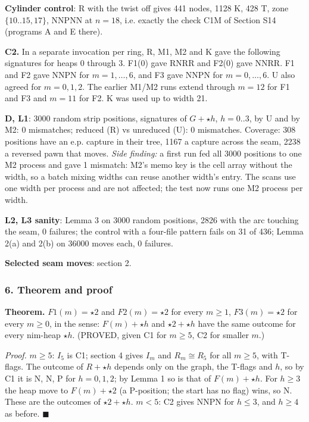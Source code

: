 \textbf{Cylinder control}: R with the twist off gives 441 nodes, 1128 K, 428 T, zone $\{10..15,17\}$, NNPNN at $n=18$, i.e. exactly the check C1M of Section S14 (programs A and E there).

\textbf{C2.} In a separate invocation per ring, R, M1, M2 and K gave the following signatures for heaps 0 through 3. F1(0) gave RNRR and F2(0) gave NNRR. F1 and F2 gave NNPN for $m=1,\ldots,6$, and F3 gave NNPN for $m=0,\ldots,6$. U also agreed for $m=0,1,2$. The earlier M1/M2 runs extend through $m=12$ for F1 and F3 and $m=11$ for F2. K was used up to width 21.

\textbf{D, L1}: 3000 random strip positions, signatures of $G+\star h$, $h=0..3$, by U and by M2: 0 mismatches; reduced (R) vs unreduced (U): 0 mismatches. Coverage: 308 positions have an e.p. capture in their tree, 1167 a capture across the seam, 2238 a reversed pawn that moves. \emph{Side finding:} a first run fed all 3000 positions to one M2 process and gave 1 mismatch: M2's memo key is the cell array without the width, so a batch mixing widths can reuse another width's entry. The scans use one width per process and are not affected; the test now runs one M2 process per width.

\textbf{L2, L3 sanity}: Lemma 3 on 3000 random positions, 2826 with the arc touching the seam, 0 failures; the control with a four-file pattern fails on 31 of 436; Lemma 2(a) and 2(b) on 36000 moves each, 0 failures.

\textbf{Selected seam moves}: section 2.

\subsubsection*{6. Theorem and proof}
\textbf{Theorem.} $F1(m)=\star2$ and $F2(m)=\star2$ for every $m\ge1$, $F3(m)=\star2$ for every $m\ge0$, in the sense: $F(m)+\star h$ and $\star2+\star h$ have the same outcome for every nim-heap $\star h$. (PROVED, given C1 for $m\ge5$, C2 for smaller $m$.)

\emph{Proof.} $m\ge5$: $I_5$ is C1; section 4 gives $I_m$ and $R_m\cong R_5$ for all $m\ge5$, with T-flags. The outcome of $R+\star h$ depends only on the graph, the T-flags and $h$, so by C1 it is N, N, P for $h=0,1,2$; by Lemma 1 so is that of $F(m)+\star h$. For $h\ge3$ the heap move to $F(m)+\star2$ (a P-position; the start has no flag) wins, so N. These are the outcomes of $\star2+\star h$. $m<5$: C2 gives NNPN for $h\le3$, and $h\ge4$ as before. $\blacksquare$

